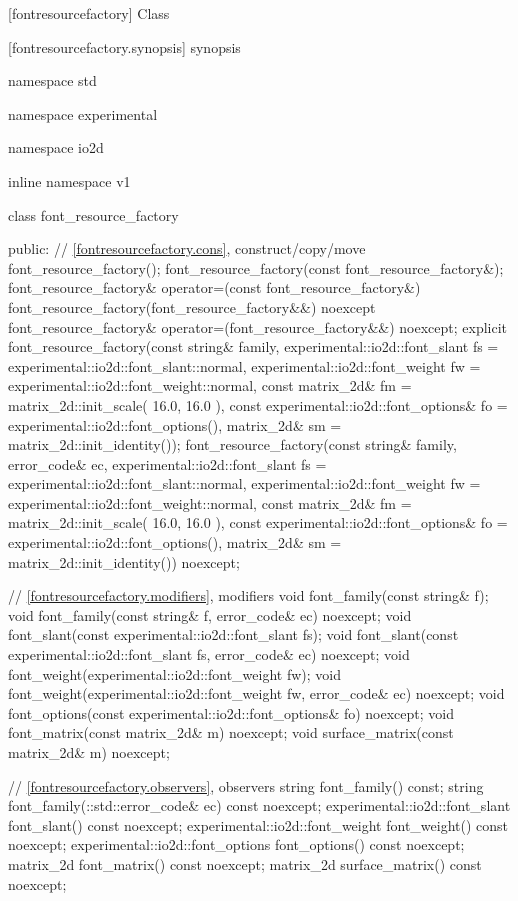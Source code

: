 
 [fontresourcefactory] {Class }

 [fontresourcefactory.synopsis] { synopsis}

\begin{codeblock}
namespace std { namespace experimental { namespace io2d { inline namespace v1 {
  class font_resource_factory {
  public:
    // \ref{fontresourcefactory.cons}, construct/copy/move
    font_resource_factory();
    font_resource_factory(const font_resource_factory&);
    font_resource_factory& operator=(const font_resource_factory&)\;
    font_resource_factory(font_resource_factory&&) noexcept\;
    font_resource_factory& operator=(font_resource_factory&&) noexcept;
    explicit font_resource_factory(const string& family, 
      experimental::io2d::font_slant fs = 
      experimental::io2d::font_slant::normal,
      experimental::io2d::font_weight fw = 
      experimental::io2d::font_weight::normal,
      const matrix_2d& fm = matrix_2d::init_scale({ 16.0, 16.0 }),
      const experimental::io2d::font_options& fo = 
      experimental::io2d::font_options(),
      matrix_2d& sm = matrix_2d::init_identity());
    font_resource_factory(const string& family, 
      error_code& ec,
      experimental::io2d::font_slant fs = 
      experimental::io2d::font_slant::normal,
      experimental::io2d::font_weight fw = 
      experimental::io2d::font_weight::normal,
      const matrix_2d& fm = matrix_2d::init_scale({ 16.0, 16.0 }),
      const experimental::io2d::font_options& fo = 
      experimental::io2d::font_options(),
      matrix_2d& sm = matrix_2d::init_identity()) noexcept;

    // \ref{fontresourcefactory.modifiers}, modifiers
    void font_family(const string& f);
    void font_family(const string& f, error_code& ec) noexcept;
    void font_slant(const experimental::io2d::font_slant fs);
    void font_slant(const experimental::io2d::font_slant fs,
      error_code& ec) noexcept;
    void font_weight(experimental::io2d::font_weight fw);
    void font_weight(experimental::io2d::font_weight fw,
      error_code& ec) noexcept;
    void font_options(const experimental::io2d::font_options& fo) noexcept;
    void font_matrix(const matrix_2d& m) noexcept;
    void surface_matrix(const matrix_2d& m) noexcept;

    // \ref{fontresourcefactory.observers}, observers
    string font_family() const;
    string font_family(::std::error_code& ec) const noexcept;
    experimental::io2d::font_slant font_slant() const noexcept;
    experimental::io2d::font_weight font_weight() const noexcept;
    experimental::io2d::font_options font_options() const noexcept;
    matrix_2d font_matrix() const noexcept;
    matrix_2d surface_matrix() const noexcept;

}}}}}
\end{codeblock}
